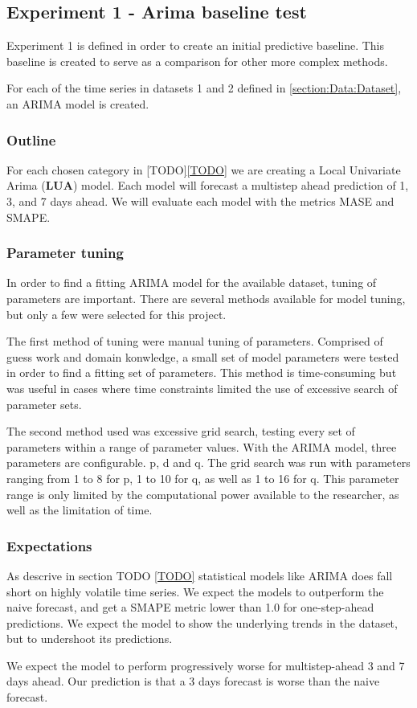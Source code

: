 
\subsection{Experiment 1 - Arima baseline test}
\label{section:Method:Experiment1-Arima}

Experiment 1 is defined in order to create an initial predictive baseline.
This baseline is created to serve as a comparison for other more complex methods.

For each of the time series in datasets 1 and 2 defined in \cref{section:Data:Dataset},
an ARIMA model is created. 

\subsubsection{Outline}
For each chosen category in [TODO]\cref{TODO} we are creating a Local Univariate Arima (\textbf{LUA})
model. Each model will forecast a multistep ahead prediction of 1, 3, and 7 days ahead.
We will evaluate each model with the metrics MASE and SMAPE.


\subsubsection{Parameter tuning}
\label{section:Method:Arima:Tuning}
In order to find a fitting ARIMA model for the available dataset, tuning of parameters are important.
There are several methods available for model tuning, but only a few were selected for this project.

The first method of tuning were manual tuning of parameters.
Comprised of guess work and domain konwledge, a small set of model parameters were tested in order to find a fitting set of parameters.
This method is time-consuming but was useful in cases where time constraints limited the use of excessive search of parameter sets.

The second method used was excessive grid search, testing every set of parameters within a range of parameter values.
With the ARIMA model, three parameters are configurable. p, d and q.
The grid search was run with parameters ranging from 1 to 8 for p, 1 to 10 for q, as well as 1 to 16 for q.
This parameter range is only limited by the computational power available to the researcher, as well as the limitation of time.


\subsubsection{Expectations}
As descrive in section TODO \cref{TODO} statistical models like ARIMA does
fall short on highly volatile time series.
We expect the models to outperform the naive forecast, and get a SMAPE metric
lower than 1.0 for one-step-ahead predictions.
We expect the model to show the underlying trends in the dataset, but to
undershoot its predictions.

We expect the model to perform progressively worse for multistep-ahead 3 and 7
days ahead. Our prediction is that a 3 days forecast is worse than the naive forecast.
